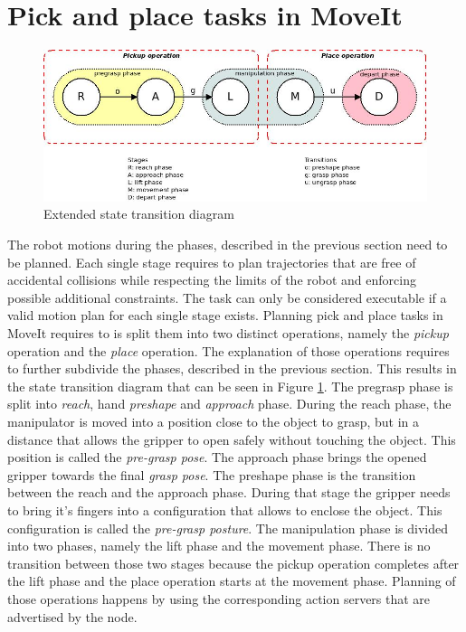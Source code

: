 \section{Pick and place tasks in MoveIt}

\begin{figure}[ht]
	\centering
  	\includegraphics[width=1.0\textwidth]{images/pick_place_states.jpg}
	\caption{Extended state transition diagram}
	\label{fig:pick_place_states}
\end{figure}

The robot motions during the phases, described in the previous section need to be planned. Each single stage requires to plan trajectories that are free of accidental collisions while respecting the limits of the robot and enforcing possible additional constraints. The task can only be considered executable if a valid motion plan for each single stage exists. Planning pick and place tasks in MoveIt requires to is split them into two distinct operations, namely the \emph{pickup} operation and the \emph{place} operation. The explanation of those operations requires to further subdivide the phases, described in the previous section. This results in the state transition diagram that can be seen in Figure \ref{fig:pick_place_states}. The pregrasp phase is split into \emph{reach}, hand \emph{preshape} and \emph{approach} phase. During the reach phase, the manipulator is moved into a position close to the object to grasp, but in a distance that allows the gripper to open safely without touching the object. This position is called the \emph{pre-grasp pose}. The approach phase brings the opened gripper towards the final \emph{grasp pose}. 
The preshape phase is the transition between the reach and the approach phase. During that stage the gripper needs to  bring it's fingers into a configuration that allows to enclose the object. This configuration is called the \emph{pre-grasp posture}. The manipulation phase is divided into two phases, namely the lift phase and the movement phase. There is no transition between those two stages because the pickup operation completes after the lift phase and the place operation starts at the movement phase. Planning of those operations happens by using the corresponding action servers that are advertised by the  node.\\


